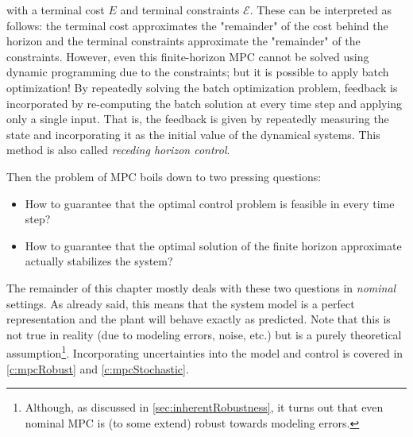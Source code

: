 	with a terminal cost \(E\) and terminal constraints \(\mathcal{E}\). These can be interpreted as follows: the terminal cost approximates the "remainder" of the cost behind the horizon and the terminal constraints approximate the "remainder" of the constraints. However, even this finite-horizon MPC cannot be solved using dynamic programming due to the constraints; but it is possible to apply batch optimization! By repeatedly solving the batch optimization problem, feedback is incorporated by re-computing the batch solution at every time step and applying only a single input. That is, the feedback is given by repeatedly measuring the state and incorporating it as the initial value of the dynamical systems. This method is also called \emph{receding horizon control}.

	Then the problem of MPC boils down to two pressing questions:
	\begin{itemize}
		\item How to guarantee that the optimal control problem is feasible in every time step?
		\item How to guarantee that the optimal solution of the finite horizon approximate actually stabilizes the system?
	\end{itemize}
	The remainder of this chapter mostly deals with these two questions in \emph{nominal} settings. As already said, this means that the system model is a perfect representation and the plant will behave exactly as predicted. Note that this is not true in reality (due to modeling errors, noise, etc.) but is a purely theoretical assumption\footnote{Although, as discussed in \autoref{sec:inherentRobustness}, it turns out that even nominal MPC is (to some extend) robust towards modeling errors.}. Incorporating uncertainties into the model and control is covered in \autoref{c:mpcRobust} and \ref{c:mpcStochastic}.

